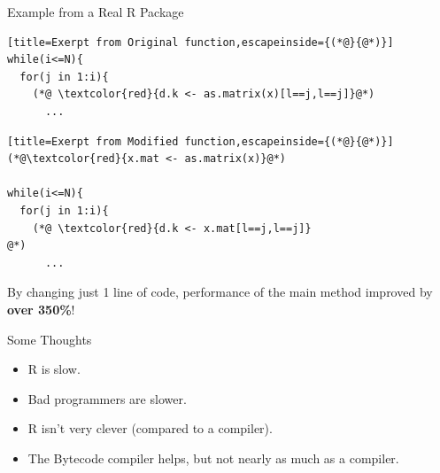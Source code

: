 \begin{frame}[fragile]{Example from a Real R Package}
    \begin{center}
\begin{minipage}[t]{.6\textwidth}
\vspace{-.9cm}
\begin{lstlisting}[title=Exerpt from Original function,escapeinside={(*@}{@*)}]
while(i<=N){
  for(j in 1:i){
    (*@ \textcolor{red}{d.k <- as.matrix(x)[l==j,l==j]}@*)
      ...
\end{lstlisting}
\vspace{-.3cm}
\begin{lstlisting}[title=Exerpt from Modified function,escapeinside={(*@}{@*)}]
(*@\textcolor{red}{x.mat <- as.matrix(x)}@*)
  
while(i<=N){
  for(j in 1:i){
    (*@ \textcolor{red}{d.k <- x.mat[l==j,l==j]}
@*)
      ...
\end{lstlisting}
\end{minipage}
\begin{minipage}[t]{.34\textwidth}
\vspace{1.1cm}
By changing just 1 line of code, performance of the main 
method improved by \textbf{over 350\%}!
\end{minipage}
\end{center}
\end{frame}


\begin{frame}
  \begin{block}{Some Thoughts}
    \begin{itemize}
      \item R is slow.
      \item Bad programmers are slower.
      \item R isn't very clever (compared to a compiler).
      \item The Bytecode compiler helps, but not nearly as much as a compiler.
    \end{itemize}
  \end{block}
\end{frame}

